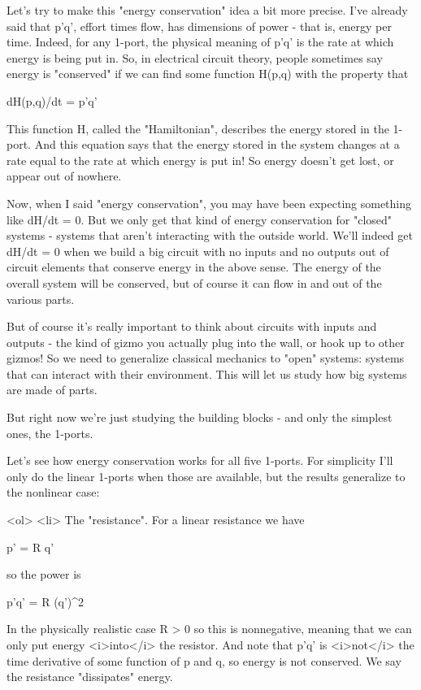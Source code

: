 Let's try to make this "energy conservation" idea a bit more
precise.  I've already said that p'q', effort times flow, has
dimensions of power - that is, energy per time.  Indeed, for any
1-port, the physical meaning of p'q' is the rate at which energy is
being put in.  So, in electrical circuit theory, people sometimes say
energy is "conserved" if we can find some function H(p,q)
with the property that

 dH(p,q)/dt = p'q'

This function H, called the "Hamiltonian", describes the
energy stored in the 1-port.  And this equation says that the energy
stored in the system changes at a rate equal to the rate at which
energy is put in!  So energy doesn't get lost, or appear out of
nowhere.

Now, when I said "energy conservation", you may have been
expecting something like dH/dt = 0.  But we only get that kind of
energy conservation for "closed" systems - systems that
aren't interacting with the outside world.  We'll indeed get dH/dt = 0
when we build a big circuit with no inputs and no outputs out of
circuit elements that conserve energy in the above sense.  The energy
of the overall system will be conserved, but of course it can flow in
and out of the various parts.

But of course it's really important to think about circuits with
inputs and outputs - the kind of gizmo you actually plug into the
wall, or hook up to other gizmos!  So we need to generalize classical
mechanics to "open" systems: systems that can interact with their
environment.  This will let us study how big systems are made of
parts.  

But right now we're just studying the building blocks - and only the
simplest ones, the 1-ports.

Let's see how energy conservation works for all five 1-ports.  For
simplicity I'll only do the linear 1-ports when those are available,
but the results generalize to the nonlinear case:

<ol>
<li>
   The "resistance".   For a linear resistance we have

  p' = R q'

  so the power is

  p'q' = R (q')^{2}

  In the physically realistic case R > 0 so this is nonnegative,
  meaning that we can only put energy <i>into</i> the resistor.
  And note that p'q' is <i>not</i> the time derivative of some 
  function of p and q, so energy is not conserved.  We say the
  resistance "dissipates" energy.

